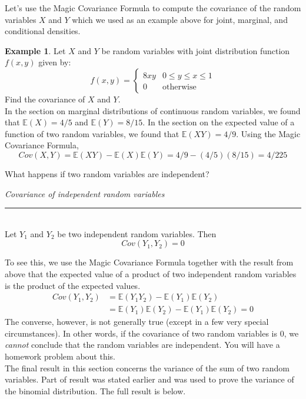 \documentclass[12pt]{article}
\theoremstyle{definition}
\newtheorem*{example}{Example}
\theoremstyle{remark}
\def\E{{\mathbb E}}
\begin{document}
Let's use the Magic Covariance Formula to compute the covariance of the random variables $X$ and $Y$ which we used as an example above for joint, marginal, and conditional densities.

\begin{example}
Let $X$ and $Y$ be random variables with joint distribution function $f(x, y)$ given by:
\[
f(x, y) = \begin{cases} 
      8 x y  & 0 \leq y \leq x \leq 1 \\
      0 & \textrm{otherwise}
   \end{cases}
\]
Find the covariance of $X$ and $Y$.\\

In the section on marginal distributions of continuous random variables, we found that $\E(X) = 4/5$ and $\E(Y) = 8/15$. In the section on the expected value of a function of two random variables, we found that $\E(XY) = 4/9$. Using the Magic Covariance Formula,
\[
Cov(X, Y) = \E(XY) - \E(X) \E(Y) = 4/9 - (4/5)(8/15) = 4/225
\]
\end{example}

What happens if two random variables are independent?

\begin{framed}
  \emph{Covariance of independent random variables}\\
  \rule{\dimexpr{}\fboxrule}{.1pt} \\
Let $Y_1$ and $Y_2$ be two independent random variables. Then
\[
Cov(Y_1, Y_2) = 0
\]
\end{framed}
To see this, we use the Magic Covariance Formula together with the result from above that the expected value of a product of two independent random variables is the product of the expected values.
\begin{align*}
Cov(Y_1, Y_2) &= \E(Y_1 Y_2) - \E(Y_1)\E(Y_2)\\
&= \E(Y_1)\E(Y_2) - \E(Y_1)\E(Y_2) = 0
\end{align*}
The converse, however, is not generally true (except in a few very special circumstances). In other words, if the covariance of two random variables is 0, we \emph{cannot} conclude that the random variables are independent. You will have a homework problem about this.\\

The final result in this section concerns the variance of the sum of two random variables. Part of result was stated earlier and was used to prove the variance of the binomial distribution. The full result is below.
\end{document}
